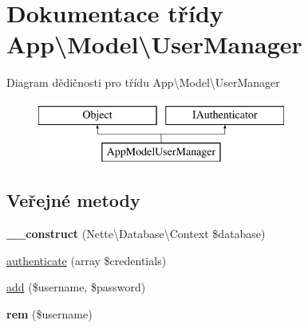 \hypertarget{classApp_1_1Model_1_1UserManager}{\section{Dokumentace třídy App\textbackslash{}Model\textbackslash{}User\-Manager}
\label{classApp_1_1Model_1_1UserManager}
}
Diagram dědičnosti pro třídu App\textbackslash{}Model\textbackslash{}User\-Manager\begin{figure}[H]
\begin{center}
\leavevmode
\includegraphics[height=2.000000cm]{classApp_1_1Model_1_1UserManager}
\end{center}
\end{figure}
\subsection*{Veřejné metody}
\begin{DoxyCompactItemize}
\item 
\hypertarget{classApp_1_1Model_1_1UserManager_a23dc73158ccaf8bf52b06acb5178a8d6}{{\bfseries \-\_\-\-\_\-construct} (Nette\textbackslash{}\-Database\textbackslash{}\-Context \$database)}\label{classApp_1_1Model_1_1UserManager_a23dc73158ccaf8bf52b06acb5178a8d6}

\item 
\hyperlink{classApp_1_1Model_1_1UserManager_a77f1c9e747f34dce198c80b6e74cc0ec}{authenticate} (array \$credentials)
\item 
\hyperlink{classApp_1_1Model_1_1UserManager_a83e47d69f7eb85866c86d9e611b9b771}{add} (\$username, \$password)
\item 
\hypertarget{classApp_1_1Model_1_1UserManager_ab9e3b28e92045c329235517f0a75fbef}{{\bfseries rem} (\$username)}\label{classApp_1_1Model_1_1UserManager_ab9e3b28e92045c329235517f0a75fbef}

\end{DoxyCompactItemize}
